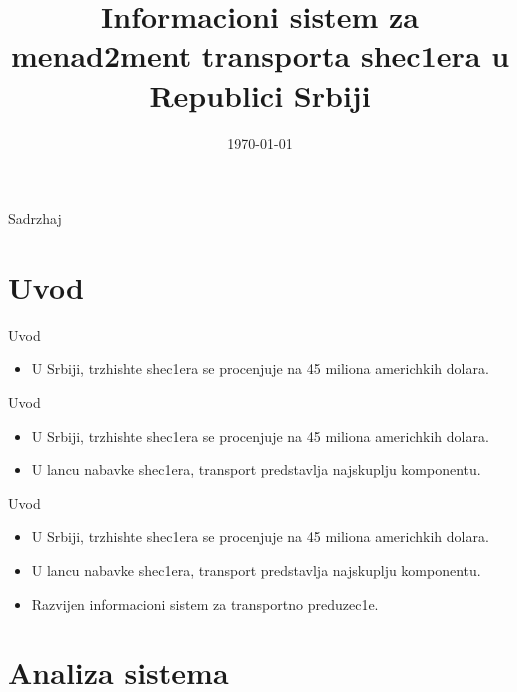 \documentclass[11pt]{beamer}
\title{Informacioni sistem za menad2ment transporta shec1era u Republici Srbiji}
\institute[]{Matematichki fakultet \\ Univerzitet u Beogradu}
\date{\today}
\begin{document}
\begin{frame}
\titlepage
\end{frame}

\begin{frame}{Sadrzhaj}
\tableofcontents 
\end{frame}
\section{Uvod}
\begin{frame}{Uvod}
\begin{itemize}
    \item U Srbiji, trzhishte shec1era se procenjuje na 45 miliona americhkih dolara.

\end{itemize}
\end{frame}
\begin{frame}{Uvod}
\begin{itemize}
    \item U Srbiji, trzhishte shec1era se procenjuje na 45 miliona americhkih dolara.
    \item U lancu nabavke shec1era, transport predstavlja najskuplju komponentu.

\end{itemize}
\end{frame}
\begin{frame}{Uvod}
\begin{itemize}
    \item U Srbiji, trzhishte shec1era se procenjuje na 45 miliona americhkih dolara.
    \item U lancu nabavke shec1era, transport predstavlja najskuplju komponentu.

    \item Razvijen informacioni sistem za transportno preduzec1e.
\end{itemize}
\end{frame}
\section{Analiza sistema}
\end{document}
